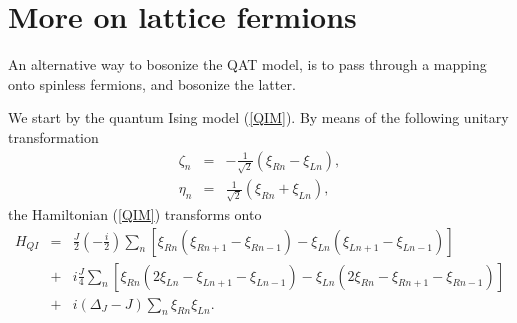 \newpage

\section{More on lattice fermions}
\label{Lattice-fermions}

An alternative way to bosonize the QAT model, is to pass through a
mapping onto spinless fermions, and bosonize the latter.

We start by the quantum Ising model (\ref{QIM}). By
means of the following unitary transformation
\begin{eqnarray}
\zeta_n &=&-\frac{1}{\sqrt{2}}\left(\xi_{Rn}-\xi_{Ln}\right),\\
\eta_n &=&\frac{1}{\sqrt{2}}\left(\xi_{Rn}+\xi_{Ln}\right),
\end{eqnarray}
the Hamiltonian (\ref{QIM}) transforms onto
\begin{eqnarray}
H_{QI} &=& \frac{J}{2}\left(-\frac{i}{2}\right)\sum_n
\left[  \xi_{Rn}\left(\xi_{Rn+1}-\xi_{Rn-1}\right) -\xi_{Ln}\left(\xi_{Ln+1}-\xi_{Ln-1}\right) \right] \nonumber\\
&+&i\frac{J}{4}\sum_n \left[ \xi_{Rn}\left(2\xi_{Ln}-\xi_{Ln+1}-\xi_{Ln-1}\right) -\xi_{Ln}\left(2\xi_{Rn}-\xi_{Rn+1}-\xi_{Rn-1}\right)\right]\nonumber\\
&+& i\left(\Delta_J-J\right)\sum_n \xi_{Rn}\xi_{Ln}.
\label{HIsing}
\end{eqnarray}

